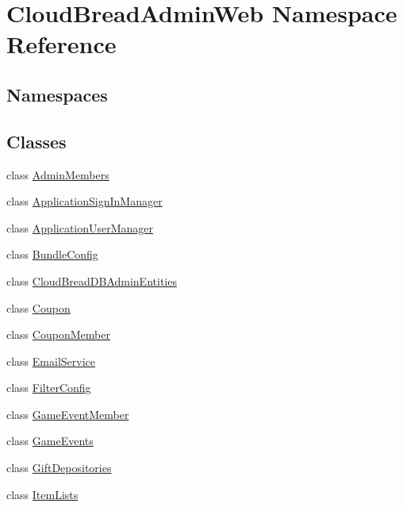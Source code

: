 \hypertarget{namespace_cloud_bread_admin_web}{}\section{Cloud\+Bread\+Admin\+Web Namespace Reference}
\label{namespace_cloud_bread_admin_web}
\subsection*{Namespaces}
\begin{DoxyCompactItemize}
\end{DoxyCompactItemize}
\subsection*{Classes}
\begin{DoxyCompactItemize}
\item 
class \hyperlink{class_cloud_bread_admin_web_1_1_admin_members}{Admin\+Members}
\item 
class \hyperlink{class_cloud_bread_admin_web_1_1_application_sign_in_manager}{Application\+Sign\+In\+Manager}
\item 
class \hyperlink{class_cloud_bread_admin_web_1_1_application_user_manager}{Application\+User\+Manager}
\item 
class \hyperlink{class_cloud_bread_admin_web_1_1_bundle_config}{Bundle\+Config}
\item 
class \hyperlink{class_cloud_bread_admin_web_1_1_cloud_bread_d_b_admin_entities}{Cloud\+Bread\+D\+B\+Admin\+Entities}
\item 
class \hyperlink{class_cloud_bread_admin_web_1_1_coupon}{Coupon}
\item 
class \hyperlink{class_cloud_bread_admin_web_1_1_coupon_member}{Coupon\+Member}
\item 
class \hyperlink{class_cloud_bread_admin_web_1_1_email_service}{Email\+Service}
\item 
class \hyperlink{class_cloud_bread_admin_web_1_1_filter_config}{Filter\+Config}
\item 
class \hyperlink{class_cloud_bread_admin_web_1_1_game_event_member}{Game\+Event\+Member}
\item 
class \hyperlink{class_cloud_bread_admin_web_1_1_game_events}{Game\+Events}
\item 
class \hyperlink{class_cloud_bread_admin_web_1_1_gift_depositories}{Gift\+Depositories}
\item 
class \hyperlink{class_cloud_bread_admin_web_1_1_item_lists}{Item\+Lists}

\end{DoxyCompactItemize}
